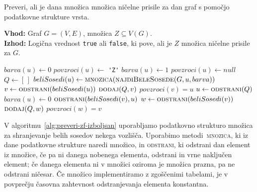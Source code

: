 \documentclass[12pt,a4paper,twoside]{article}
\theoremstyle{definition} %
\theoremstyle{plain} %
\numberwithin{equation}{section}  %
\begin{document}
\begin{algorithm}[!h]
    \caption{Preveri, ali je dana množica množica ničelne prisile za dan graf s pomočjo podatkovne strukture vrsta.}
    \label{alg:preveri-zf-izboljsan}
    \raggedright
    \textbf{Vhod:} Graf $G = (V,E)$, množica $Z \subseteq V(G)$. \\
    \textbf{Izhod:} Logična vrednost \texttt{true} ali \texttt{false}, ki pove, ali je $Z$ množica ničelne prisile za $G$.
    \begin{algorithmic}[1]
        \State $barva(u) \gets 0$ 
        \State $povzroci(u) \gets$ \verb|'Z'|  
        \EndFor
        \State $barva(u) \gets 1$ 
        \State $povzroci(u) \gets null$
        \EndFor
        \State $Q \gets [\,]$ 
          
        \State $beliSosedi(u) \gets \textsc{mnozica}(\Call{najdiBeleSosede}{G, u, barva})$
        \State $v \gets \Call{odstrani}{beliSosedi(u)}$ 
          
        \State $\Call{dodaj}{Q, v}$ 
        \State $povzroci(v) = u$  
        \EndIf
        \EndIf
        \EndFor
         
        \State $u \gets \Call{odstrani}{Q}$  
        \State $barva(u) \gets 0$  
         
        \State $\Call{odstrani}{beliSosedi(v), u}$ 
        \State $w \gets \Call{odstrani}{beliSosedi(v)}$
        \State $\Call{dodaj}{Q, w}$
        \State $povzroci(w) = v$
        \EndIf
        \EndIf
        \EndFor
        \EndWhile
        \State \Return {}
        \EndFunction
    \end{algorithmic}
\end{algorithm}

V algoritmu~\ref{alg:preveri-zf-izboljsan} uporabljamo podatkovno strukturo množica za shranjevanje belih sosedov nekega vozlišča. Uporabimo metodi~\textsc{mnozica}, ki iz dane podatkovne strukture naredi množico, in \textsc{odstrani}, ki odstrani dan element iz množice, če pa ni danega nobenega elementa, odstrani in vrne naključen element; če danega elementa ni v množici oziroma je množica prazna, pa ne odstrani ničesar. Če množico implementiramo z zgoščenimi tabelami, je v povprečju časovna zahtevnost odstran\-jevanja elementa konstantna.
\end{document}
